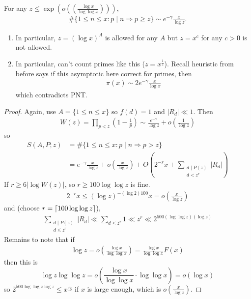 \documentclass{article}
\DeclarePairedDelimiter\ceil{\lceil}{\rceil}
\begin{document}
\begin{cor}
  For any $z \leq \exp(o((\frac{\log x}{\log \log x})))$,
  \begin{align*}
    \#\{1 \leq n \leq x : p \mid n \Rightarrow p \geq z\} \sim e^{-\gamma} \frac{x}{\log z}.
  \end{align*}
\end{cor}
\begin{remark}\leavevmode
  \begin{enumerate}[label=(\arabic*)]
    \item In particular, $z = (\log x)^A$ is allowed for any $A$ but $z = x^c$ for any $c > 0$ is not allowed.
    \item In particular, can't count primes like this ($z = x^{\frac 12}$).
      Recall heuristic from before says if this asymptotic here correct for primes, then
      \begin{align*}
        \pi(x) \sim 2 e^{-\gamma} \frac{x}{\log x}
      \end{align*}
      which contradicts PNT.
  \end{enumerate}
\end{remark}
\begin{proof}
  Again, use $A = \{1 \leq n \leq x\}$ so $f(d) = 1$ and $|R_d| \ll 1$. Then
  \begin{align*}
    W(z) = \prod_{p < z} \left(1 - \frac 1p\right) \sim \frac{e^{-\gamma}}{\log z} + o\left(\frac{1}{\log z}\right)
  \end{align*}
  so
  \begin{align*}
    S(A,P;z) &= \#\{1 \leq n \leq x : p \mid n \Rightarrow p > z\} \\
    &= e^{-\gamma} \frac{x}{\log z} + o\left(\frac{x}{\log z}\right)+ O\left(2^{-r} x + \sum_{\substack{d \mid P(z) \\ d < z^r}} |R_d|\right)
  \end{align*}
  If $r \geq 6 |\log W(z)|$, so $r \geq 100 \log \log z$ is fine.
  \begin{align*}
    2^{-r} x \leq (\log z)^{- (\log 2) 100} x = o\left(\frac{x}{\log z}\right)
  \end{align*}
  and
  (choose $r = \ceil{100 \log \log z}$),
  \begin{align*}
    \sum_{\substack{d \mid P(z) \\ d \leq z^r}} |R_d| \ll \sum_{d \leq z^r} 1 \ll z^r \ll 2^{500 (\log \log z)(\log z)}
  \end{align*}
  Remains to note that if
  \begin{align*}
    \log z = o\left(\frac{\log x}{\log \log x}\right) = \frac{\log x}{\log \log x} F(x)
  \end{align*}
  then this is
  \begin{equation*}
    \log z \log \log z = o\left(\frac{\log x}{\log \log x} \cdot \log \log x\right) = o(\log x)
  \end{equation*}
  so $2^{500 \log \log z \log z} \leq x^{\frac{1}{10}}$ if $x$ is large enough, which is $o(\frac{x}{\log z})$.
\end{proof}
\end{document}
